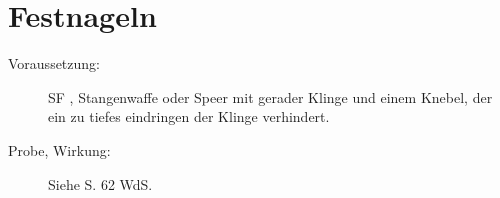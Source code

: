 \section{Festnageln}
\label{aktion.festnageln}
\begin{description}
    \item[Voraussetzung:]
        SF , Stangenwaffe oder Speer mit gerader Klinge und einem Knebel, der ein zu tiefes eindringen der Klinge verhindert.
    \item[Probe, Wirkung:]
        Siehe S. 62 WdS.
\end{description}
